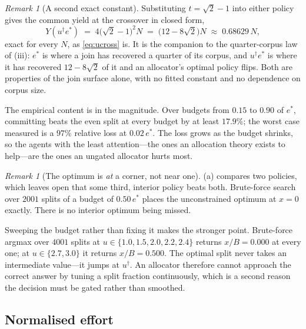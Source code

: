 \documentclass[11pt,twocolumn,a4paper]{article}
\theoremstyle{thmstyle}
\theoremstyle{definition}
\theoremstyle{remark}
\newtheorem{remark}[theorem]{Remark}
\newcommand{\estar}{e^{*}}
\newcommand{\ucross}{u^{\dagger}}
\newcommand{\yield}{Y}
\begin{document}
\begin{remark}[A second exact constant]
\label{rem:yieldatucross}
Substituting $t=\sqrt2-1$ into either policy gives the common yield at
the crossover in closed form,
\begin{equation}
\yield(\ucross\estar)\;=\;4\bigl(\sqrt2-1\bigr)^{2}N
\;=\;\bigl(12-8\sqrt2\bigr)N\;\approx\;0.68629\,N,
\label{eq:yieldatucross}
\end{equation}
exact for every $N$, as \eqref{eq:ucross} is. It is the companion to the
quarter-corpus law of (iii): $\estar$ is where a
join has recovered a quarter of its corpus, and $\ucross\estar$ is where
it has recovered $12-8\sqrt2$ of it and an allocator's optimal policy
flips. Both are properties of the join surface alone, with no fitted
constant and no dependence on corpus size.
\end{remark}

The empirical content is in the magnitude. Over budgets from $0.15$ to
$0.90$ of $\estar$, committing beats the even split at every budget by
at least $17.9\%$; the worst case measured is a $97\%$ relative loss at
$0.02\,\estar$. The loss grows as the budget shrinks, so the agents with
the least attention---the ones an allocation theory exists to help---are
the ones an ungated allocator hurts most.

\begin{remark}[The optimum is \emph{at} a corner, not near one]
\label{rem:atcorner}
(a) compares two policies, which leaves open that some
third, interior policy beats both. Brute-force search over $2001$ splits
of a budget of $0.50\,\estar$ places the unconstrained optimum at
$x=0$ exactly. There is no interior optimum being missed.

Sweeping the budget rather than fixing it makes the stronger point.
Brute-force argmax over $4001$ splits at
$u\in\{1.0,1.5,2.0,2.2,2.4\}$ returns $x/B=0.000$ at every one; at
$u\in\{2.7,3.0\}$ it returns $x/B=0.500$. The optimal split never takes
an intermediate value---it jumps at $\ucross$. An allocator therefore
cannot approach the correct answer by tuning a split fraction
continuously, which is a second reason the decision must be gated rather
than smoothed.
\end{remark}

\subsection{Normalised effort}
\end{document}
